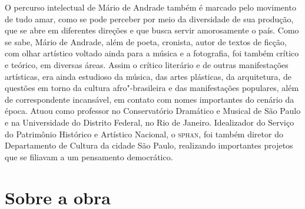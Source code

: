 \medskip

O percurso intelectual de Mário de Andrade também é marcado pelo
movimento de tudo amar, como se pode perceber por meio da diversidade de
sua produção, que se abre em diferentes direções e que busca servir
amorosamente o país. Como se sabe, Mário de Andrade, além de poeta,
cronista, autor de textos de ficção, com olhar artístico voltado ainda
para a música e a fotografia, foi também crítico e teórico, em diversas
áreas. Assim o crítico literário e de outras manifestações artísticas,
era ainda estudioso da música, das artes plásticas, da arquitetura, de
questões em torno da cultura afro"-brasileira e das manifestações
populares, além de correspondente incansável, em contato com nomes
importantes do cenário da época. Atuou como professor no Conservatório
Dramático e Musical de São Paulo e na Universidade do Distrito Federal,
no Rio de Janeiro. Idealizador do Serviço do Patrimônio Histórico e
Artístico Nacional, o \textsc{sphan}, foi também diretor do Departamento de
Cultura da cidade São Paulo, realizando importantes projetos que se
filiavam a um pensamento democrático.

\section{Sobre a obra}

